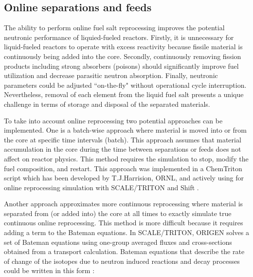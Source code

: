 \subsection{Online separations and feeds}
The ability to perform online fuel salt reprocessing improves the potential neutronic performance of liquied-fueled reactors. Firstly, it is unnecessary for liquid-fueled reactors to operate with excess reactivity because fissile material is continuously being added into the core. Secondly, continuously removing fission products including strong absorbers (poisons) should significantly improve fuel utilization and decrease parasitic neutron absorption. Finally, neutronic parameters could be adjusted ``on-the-fly" without operational cycle interruption. Nevertheless, removal of each element from the liquid fuel salt presents a unique challenge in terms of storage and disposal of the separated materials.

To take into account online reprocessing two potential approaches can be implemented. One is a batch-wise approach where material is moved into or from the core at specific time intervals (batch). This approach assumes that material accumulation in the core during the time between separations or feeds does not affect on reactor physics. This method requires the simulation to stop, modify the fuel composition, and restart. This approach was implemented in a ChemTriton script \cite{powers_new_2013} which has been developed by T.J.Harrision, \gls{ORNL}, and actively using for online reprocessing simulation with SCALE/TRITON \cite{bowman_scale_2011} and Shift \cite{pandya_implementation_2016}. 

Another approach approximates more continuous reprocessing where material is separated from (or added into) the core at all times to exactly simulate true continuous online reprocessing. This method is more difficult because it requires adding a term to the Bateman equations. In SCALE/TRITON, ORIGEN \cite{gauld_isotopic_2011} solves a set of Bateman equations using one-group averaged fluxes and cross-sections obtained from a transport calculation. Bateman equations that describe the rate of change of the isotopes due to neutron induced reactions and decay
processes could be written in this form \cite{aufiero_extended_2013}:

